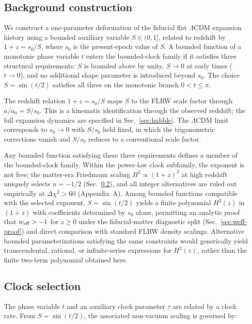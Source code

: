 \documentclass[
  aps,
  prd,
  onecolumn,         %
  nofootinbib,
  longbibliography
]{revtex4-2}
\begin{document}
\subsection{Background construction}\label{sec:ansatz}

We construct a one-parameter deformation of the fiducial flat $\Lambda$CDM expansion history
using a bounded auxiliary variable $S\in(0,1]$, related to redshift by
$1 + z = s_0/S$, where $s_0$ is the present-epoch value of $S$. A bounded
function of a monotonic phase variable $t$ enters the bounded-clock
family if it satisfies three structural requirements: $S$ is bounded
above by unity, $S \to 0$ at early times ($t \to 0$), and no additional
shape parameter is introduced beyond $s_0$. The choice $S = \sin(t/2)$
satisfies all three on the monotonic branch
$0 < t \leq \pi$.

The redshift relation $1+z=s_0/S$ maps $S$ to the FLRW scale factor through
$a/a_0=S/s_0$. This is a kinematic identification through the observed
redshift; the full expansion dynamics are specified in Sec.~\ref{sec:hubble}.
The $\Lambda$CDM limit corresponds to
$s_0 \to 0$ with $S/s_0$ held fixed, in which the trigonometric corrections
vanish and $S/s_0$ reduces to a conventional scale factor.

Any bounded function satisfying these three requirements defines a member
of the bounded-clock family. Within the power-law clock subfamily, the
exponent is not free: the matter-era Friedmann scaling
$H^2 \propto (1+z)^3$ at high redshift uniquely selects $n = -1/2$
(Sec.~\ref{sec:clock}), and all integer alternatives are ruled out
empirically at $\Delta\chi^2 > 60$ (Appendix~A). Among bounded functions
compatible with the selected exponent, $S = \sin(t/2)$ yields a finite
polynomial $H^2(z)$ in $(1+z)$ with coefficients determined by $s_0$ alone, permitting an analytic proof that
$w_{\rm eff} > -1$ for $z \geq 0$ under the fiducial-matter diagnostic split (Sec.~\ref{sec:weff-proof}) and
direct comparison with standard FLRW density scalings. Alternative
bounded parameterizations satisfying the same constraints would
generically yield transcendental, rational, or infinite-series
expressions for $H^2(z)$, rather than the finite two-term polynomial
obtained here.

\subsection{Clock selection}\label{sec:clock}

The phase variable $t$ and an auxiliary clock parameter $\tau$ are related
by a clock rate. From $S = \sin(t/2)$, the associated non-vacuum scaling
is governed by:
\end{document}
